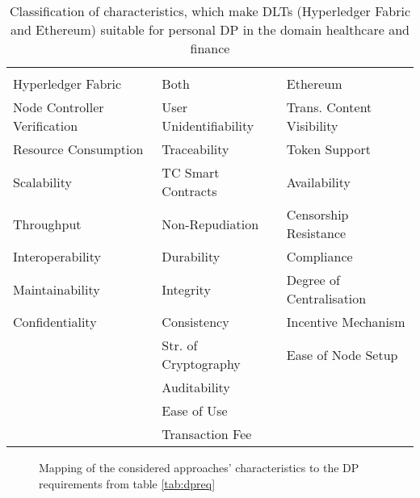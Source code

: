 \begin{table}[H]
    \centering
     \caption{Classification of characteristics, which make DLTs (Hyperledger Fabric and Ethereum) suitable for personal DP in the domain healthcare and finance}
    \label{tab:RQ}
    
\begin{tabular}{m{5cm} m{4cm} m{5cm}}

&&\\
\hspace{20pt}Hyperledger Fabric & \hspace{40pt}Both & \hspace{35pt}Ethereum \\ \hline

\rule{0pt}{3ex}Node Controller Verification & \rule{0pt}{3ex}User Unidentifiability & \rule{0pt}{3ex}Trans. Content Visibility\\
Resource Consumption & Traceability & Token Support\\
Scalability & TC Smart Contracts & Availability\\
Throughput & Non-Repudiation & Censorship Resistance\\
Interoperability & Durability & Compliance\\
Maintainability & Integrity & Degree of Centralisation\\
Confidentiality & Consistency & Incentive Mechanism\\
 & Str. of Cryptography& Ease of Node Setup\\
  & Auditability & \\
   & Ease of Use & \\
    & Transaction Fee & \\

\end{tabular}
\end{table}

\begin{figure}[H]
    \centering
    \caption{Mapping of the considered approaches' characteristics to the DP requirements from table \ref{tab:dpreq}}
    
    
    \label{fig:map-cac-dpr}
\end{figure}

 



